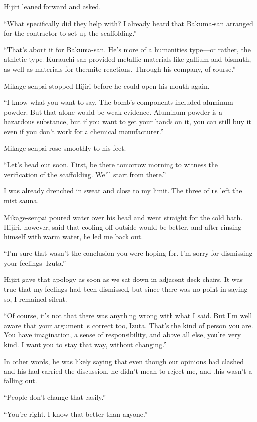 \documentclass[
    a4paper,
    12pt,
    twoside,
    openany,
    UTF8,
    fontset=windows
]{ctexbook}
\begin{document}
Hijiri leaned forward and asked.

``What specifically did they help with? I already heard that Bakuma-san arranged for the contractor to set up the scaffolding.''

``That's about it for Bakuma-san. He's more of a humanities type---or rather, the athletic type. Kurauchi-san provided metallic materials like gallium and bismuth, as well as materials for thermite reactions. Through his company, of course.''

Mikage-senpai stopped Hijiri before he could open his mouth again.

``I know what you want to say. The bomb's components included aluminum powder. But that alone would be weak evidence. Aluminum powder is a hazardous substance, but if you want to get your hands on it, you can still buy it even if you don't work for a chemical manufacturer.''

Mikage-senpai rose smoothly to his feet.

``Let's head out soon. First, be there tomorrow morning to witness the verification of the scaffolding. We'll start from there.''

I was already drenched in sweat and close to my limit. The three of us left the mist sauna.

Mikage-senpai poured water over his head and went straight for the cold bath. Hijiri, however, said that cooling off outside would be better, and after rinsing himself with warm water, he led me back out.

``I'm sure that wasn't the conclusion you were hoping for. I'm sorry for dismissing your feelings, Izuta.''

Hijiri gave that apology as soon as we sat down in adjacent deck chairs. It was true that my feelings had been dismissed, but since there was no point in saying so, I remained silent.

``Of course, it's not that there was anything wrong with what I said. But I'm well aware that your argument is correct too, Izuta. That's the kind of person you are. You have imagination, a sense of responsibility, and above all else, you're very kind. I want you to stay that way, without changing.''

In other words, he was likely saying that even though our opinions had clashed and his had carried the discussion, he didn't mean to reject me, and this wasn't a falling out.

``People don't change that easily.''

``You're right. I know that better than anyone.''
\end{document}
